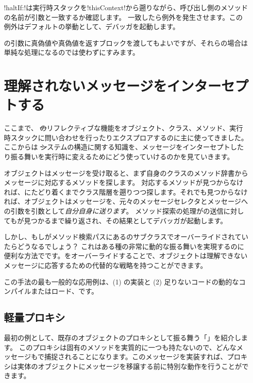 \documentclass[a4paper,10pt,twoside]{book}
\begin{document}
\ct!haltIf:!は実行時スタックを\ct!thisContext!から遡りながら、呼び出し側のメソッドの名前が引数と一致するか確認します。
一致したら例外を発生させます。この例外はデフォルトの挙動として、デバッガを起動します。

の引数に真偽値や真偽値を返すブロックを渡してもよいですが、それらの場合は単純な処理になるのでは使わずにすみます。

\section{理解されないメッセージをインターセプトする}

ここまで、 \st のリフレクティブな機能をオブジェクト、クラス、メソッド、実行時スタックに問い合わせを行ったりエクスプロアするのに主に使ってきました。ここからは \st システムの構造に関する知識を、メッセージをインターセプトしたり振る舞いを実行時に変えるためにどう使っていけるのかを見ていきます。

オブジェクトはメッセージを受け取ると、まず自身のクラスのメソッド辞書からメッセージに対応するメソッドを探します。
対応するメソッドが見つからなければ、にたどり着くまでクラス階層を遡りつつ探します。それでも見つからなければ、オブジェクトはメッセージを、元々のメッセージセレクタとメッセージへの引数を引数として\emph{自分自身に送ります}。
メソッド探索の処理がの送信に対してもが見つかるまで繰り返され、その結果としてデバッガが起動します。

しかし、もしがメソッド検索パスにあるのサブクラスでオーバーライドされていたらどうなるでしょう？
これはある種の非常に動的な振る舞いを実現するのに便利な方法でです。をオーバーライドすることで、オブジェクトは理解できないメッセージに応答するための代替的な戦略を持つことができます。

この手法の最も一般的な応用例は、(1) の実装と (2) 足りないコードの動的なコンパイルまたはロード、です。

\subsection{軽量プロキシ}

最初の例として、既存のオブジェクトのプロキシとして振る舞う「」を紹介します。
このプロキシは固有のメソッドを実質的に一つも持たないので、どんなメッセージもで捕捉されることになります。このメッセージを実装すれば、プロキシは実体のオブジェクトにメッセージを移譲する前に特別な動作を行うことができます。
\end{document}

